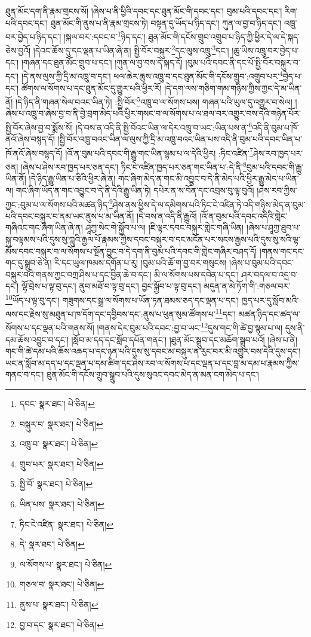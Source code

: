 ཐུན་མོང་དག་ནི་རྣམ་གྲངས་སོ། །ཞེས་པ་ནི་ཕྱིའི་དབང་དང་ཐུན་མོང་གི་དབང་དང་། བུམ་པའི་དབང་དང་། རིག་པའི་དབང་དང་། ཐུན་མོང་གི་ནུས་པ་ནི་རྣམ་གྲངས་ཏེ། བསྟན་དུ་ཡོད་པ་ཉིད་དང་། ཀུན་ལ་བྱ་བ་ཉིད་དང་། འཁྲུ་བར་བྱེད་པ་ཉིད་དང་། །སྐལ་བར་:དབང་བ་\footnote{དབང་  སྣར་ཐང་།  པེ་ཅིན། }ཉིད་དང་། ཐུན་མོང་གི་དངོས་གྲུབ་འགྲུབ་པ་ཉིད་ཀྱི་ཕྱིར་དེ་ལ་དེ་སྐད་ཅེས་བྱའོ། །དེའང་ཆོས་དུ་དང་ལྡན་པ་ཡིན་ཞེ་ན། སྤྱི་བོར་བསྐུར་\footnote{བསྐུར་བ་  སྣར་ཐང་།  པེ་ཅིན། }དང་ལུས་འཁྲུ་\footnote{འཁྲུ་བ་  སྣར་ཐང་།  པེ་ཅིན། }དང་། །ཆུ་ཡིས་འཁྲུ་བར་བྱེད་པ་དང་། །གཞན་དང་ཐུན་མོང་གྲུབ་པ་དང་། །ཀུན་ལ་བྱ་བས་དེ་སྐད་དོ། །བུམ་པའི་དབང་ནི་དང་པོ་སྤྱི་བོར་བསྐུར་བ་དང་། །དེ་ནས་ལུས་ཀྱི་དྲི་མ་འཁྲུ་བ་དང་། ཕལ་ཆེར་ཆུས་འཁྲུ་བ་དང་ཐུན་མོང་གི་དངོས་གྲུབ་:འགྲུབ་པར་\footnote{གྲུབ་པར་  སྣར་ཐང་།  པེ་ཅིན། }བྱེད་པ་དང་། ཚོགས་ལ་སོགས་པ་དང་ཐུན་མོང་དུ་གྱུར་པའི་ཕྱིར་རོ། །དེ་དག་ལས་གཅིག་གམ་གཉིས་ཀྱིས་ཀྱང་དེ་མ་ཡིན་ནོ། །དེ་ཉིད་ནི་གཞན་སེལ་བའང་ཡིན་ཏེ། :སྤྱི་བོར་\footnote{སྤྱི་བོ་  སྣར་ཐང་།  པེ་ཅིན། }འཁྲུ་བ་ལ་སོགས་པས། གཞན་པའི་ཡུལ་དུ་འགྱུར་བ་སེལ། །ཞེས་པ་འཁྲུ་བ་ཞེས་བྱ་བ་ནི་བྱེ་བྲག་མེད་པའི་ཕྱིར་གསང་བ་ལ་སོགས་པ་ལ་ཐལ་བར་འགྱུར་བས་དེའི་གཉེན་པོར་སྤྱི་བོར་ཞེས་བྱ་བ་སྨོས་སོ། །དེ་བས་ན་འདི་ནི་སྤྱི་བོའང་ཡིན་ལ་དེར་འཁྲུ་བ་ཡང་:ཡིན་པས་ན་\footnote{ཡིན་པས་  སྣར་ཐང་།  པེ་ཅིན། }འདི་ནི་བུམ་པ་ཁོ་ནའོ་ཞེས་བསྙད་དོ། །སྤྱི་བོར་འཁྲུ་བའང་ཡིན་ལ་ལུས་ཀྱི་དྲི་མ་འཁྲུ་བའང་ཡིན་པས་འདི་ནི་བུམ་པའི་དབང་ཡིན་པ་ཁོ་ནའོ་ཞེས་བསྙད་དོ། །འོ་ན་བུམ་པའི་དབང་གི་རྒྱུ་གང་ཡིན་སྙམ་པ་ལ་དེའི་ཕྱིར། :ཏིང་འཛིན་\footnote{ཏིང་ངེ་འཛིན་  སྣར་ཐང་།  པེ་ཅིན། }ཤེས་རབ་ཁྱད་པར་ཅན། །ཞེས་པ་ཤེས་རབ་ཁྱད་པར་ཅན་དང་། ཏིང་ངེ་འཛིན་ཁྱད་པར་ཅན་གང་ཡིན་པ་:དེ་ནི་\footnote{དེ་  སྣར་ཐང་།  པེ་ཅིན། }བུམ་པའི་དབང་གི་རྒྱུ་ཡིན་ནོ། །དེ་ཉིད་རྒྱུ་ཡིན་པ་ཅིའི་ཕྱིར་ཞེ་ན། གང་ཞིག་མེད་ན་གང་མི་འབྱུང་བ་དེ་ནི་མེད་པའི་ཕྱིར་རྒྱུ་མེད་པ་ཡིན་ལ། གང་ཞིག་ཡོད་ན་གང་འབྱུང་བ་དེ་ནི་དེའི་རྒྱུ་ཡིན་ཏེ། དཔེར་ན་ས་བོན་དང་འབྲས་བུ་ལྟ་བུའོ། །ཤེས་རབ་ཀྱིས་ཀྱང་:བུམ་པ་ལ་སོགས་པའི་མཚན་ཉིད་\footnote{ལ་སོགས་པ་  སྣར་ཐང་།  པེ་ཅིན། }ཤེས་ནས་ཕྱིས་དེ་ལ་དམིགས་པའི་ཏིང་ངེ་འཛིན་ཏེ་འདི་གཉིས་མེད་ན་བུམ་པའི་དབང་བསྐུར་བ་ནམ་ཡང་ནུས་པ་མ་ཡིན་ནོ། །དེ་བས་ན་འདི་ནི་རྒྱུའོ། །འོ་ན་བུམ་པའི་དབང་འདིའི་གླེང་གཞིའང་གང་ཞིག་ཡིན་ཞེ་ན། ཤཱཀྱ་སེང་གེ་སྐྱོབ་པ་ལ། །ཇི་ལྟར་དབང་བསྐུར་གླེང་གཞི་ཡིན། །ཞེས་པ་ཤཱཀྱ་ཐུབ་པ་སྐུ་བལྟམས་པའི་དུས་སུ་ཀླུའི་རྒྱལ་པོ་རྣམས་ཀྱིས་དབང་བསྐུར་བ་དང་མངོན་པར་སངས་རྒྱས་པའི་དུས་སུ་སའི་ལྷ་མོས་དབང་བསྐུར་བ་ལ་སོགས་པ་སྔོན་བྱུང་བ་དེ་དག་ནི་བུམ་པའི་དབང་གི་གླེང་གཞིར་བཤད་དོ། །གནས་གང་དང་གང་དུ་སྒྲུབ་ཅེ་ན། རི་དང་ཡུལ་ཁམས་དགོན་པ་རུ། །བུམ་པའི་ཆོ་ག་བྱ་བར་གསུངས། །ཞེས་པ་བུམ་པའི་དབང་བསྐུར་བའི་གནས་ཀྱང་བཀྲ་ཤིས་པ་དང་བྱིན་ཆེ་བ་དང་། མི་ལ་སོགས་པས་དབེན་པ་དང་། ཤར་བདལ་བ་འདྲ་བ་དང་། ལྷོ་བྲེས་པ་ལྟ་བུ་དང་། ནུབ་མཐོ་བ་ལྟ་བུ་དང་། བྱང་སྐྱོབ་པ་ལྟ་བུ་དང་། མདུན་ན་མེ་ཏོག་གི་:གཅལ་བར་\footnote{གཅལ་བ་  སྣར་ཐང་།  པེ་ཅིན། }ཡོད་པ་ལྟ་བུ་དང་། གཟུགས་དང་སྒྲ་ལ་སོགས་པ་ཡོན་ཏན་ཐམས་ཅད་དང་ལྡན་པ་དང་། ཁྱད་པར་དུ་སློབ་མའི་ལས་དང་རྗེས་སུ་མཐུན་པ་ཁ་དོག་དང་དབྱིབས་དང་:ནུས་པ་ཕུན་སུམ་ཚོགས་པ་\footnote{ནུས་པ་  སྣར་ཐང་།  པེ་ཅིན། }དང་། མཚན་ཉིད་དང་ཚད་ལ་སོགས་པ་དང་ལྡན་པའི་གནས་སོ། །གནས་དེར་བུམ་པའི་དབང་:བྱ་བ་ཡང་\footnote{བྱ་བ་དང་  སྣར་ཐང་།  པེ་ཅིན། }དུས་གང་གི་ཚེ་བྱ་སྙམ་པ་ལ། དུས་ནི་དམ་ཆོས་འབྱུང་བ་དང་། །སློབ་མ་དད་དང་སློབ་དཔོན་གནང་། །ཐུན་མོང་སྒྲུབ་དང་མཆོག་སྒྲུབ་པའོ། །ཞེས་པ་ནི། གང་གི་ཚེ་དམ་པའི་ཆོས་འཆད་པ་དང་ཉན་པའི་དུས་སུ་དབང་མ་བསྐུར་ན་རུང་བར་མི་འགྱུར་བས་དེའི་དུས་དང་། ཡང་ན་སློབ་མ་དད་པ་དང་ལྡན་པ་དམ་ཚིག་དང་ཤེས་རབ་ལ་སོགས་པ་དང་ལྡན་པ་དང་བླ་མ་དམ་པ་རྣམས་ཀྱིས་གནང་བ་དང་། ཐུན་མོང་གི་དངོས་གྲུབ་སྒྲུབ་པའི་དུས་སུའང་དབང་མེད་ན་མན་ངག་མེད་པ་དང་། 